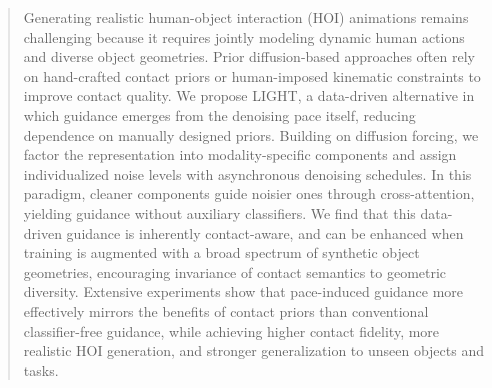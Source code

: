 \begin{abstract}
Generating realistic human-object interaction (HOI) animations remains challenging because it requires jointly modeling dynamic human actions and diverse object geometries. Prior diffusion-based approaches often rely on hand-crafted contact priors or human-imposed kinematic constraints to improve contact quality. We propose LIGHT, a data-driven alternative in which guidance emerges from the denoising pace itself, reducing dependence on manually designed priors. Building on diffusion forcing, we factor the representation into modality-specific components and assign individualized noise levels with asynchronous denoising schedules. In this paradigm, cleaner components guide noisier ones through cross-attention, yielding guidance without auxiliary classifiers. We find that this data-driven guidance is inherently contact-aware, and can be enhanced when training is augmented with a broad spectrum of synthetic object geometries, encouraging invariance of contact semantics to geometric diversity. Extensive experiments show that pace-induced guidance more effectively mirrors the benefits of contact priors than conventional classifier-free guidance, while achieving higher contact fidelity, more realistic HOI generation, and stronger generalization to unseen objects and tasks.


\end{abstract}